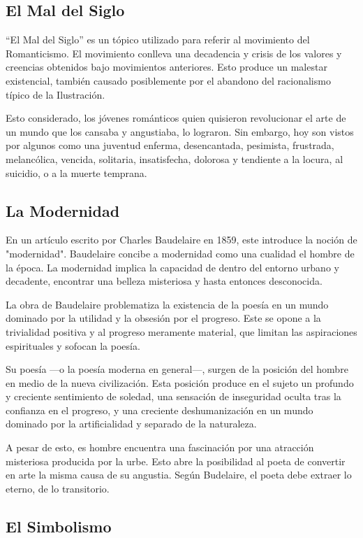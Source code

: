\documentclass{article}
\begin{document}
\subsection{El Mal del Siglo}

``El Mal del Siglo'' es un tópico utilizado para referir al movimiento del Romanticismo. El movimiento conlleva una decadencia y crisis de los valores y creencias obtenidos bajo movimientos anteriores. Esto produce un malestar existencial, también causado posiblemente por el abandono del racionalismo típico de la Ilustración.

Esto considerado, los jóvenes románticos quien quisieron revolucionar el arte de un mundo que los cansaba y angustiaba, lo lograron. Sin embargo, hoy son vistos por algunos como una juventud enferma, desencantada, pesimista, frustrada, melancólica, vencida, solitaria, insatisfecha, dolorosa y tendiente a la locura, al
suicidio, o a la muerte temprana.

\subsection{La Modernidad}

En un artículo escrito por Charles Baudelaire en 1859, este introduce la noción de "modernidad". Baudelaire concibe a modernidad como una cualidad el hombre de la época. La modernidad implica la capacidad de dentro del entorno urbano y decadente, encontrar una belleza misteriosa y hasta entonces desconocida.

La obra de Baudelaire problematiza la existencia de la poesía en un mundo dominado por la utilidad y la obsesión por el progreso. Este se opone a la trivialidad positiva y al progreso meramente material, que limitan las aspiraciones espirituales y sofocan la poesía.

Su poesía ---o la poesía moderna en general---, surgen de la posición del hombre en medio de la nueva civilización. Esta posición produce en el sujeto un profundo y creciente sentimiento de soledad, una sensación de inseguridad oculta tras la confianza en el progreso, y una creciente deshumanización en un mundo dominado por la artificialidad y separado de la naturaleza.

A pesar de esto, es hombre encuentra una fascinación por una atracción misteriosa producida por la urbe. Esto abre la posibilidad al poeta de convertir en arte la misma causa de su angustia. Según Budelaire, el poeta debe extraer lo eterno, de lo transitorio.

\subsection{El Simbolismo}
\end{document}
